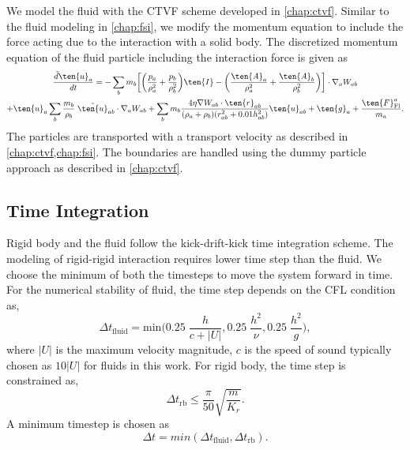 We model the fluid with the CTVF \parencite{adepu2021corrected} scheme
developed in \cref{chap:ctvf}. Similar to the fluid modeling in
\cref{chap:fsi}, we modify the momentum equation to include the force acting due
to the interaction with a solid body. The discretized momentum equation of the
fluid particle including the interaction force is given as
\begin{multline}
  \label{eq:rfc:sph-momentum-fluid}
  \frac{\tilde{d}\ten{u}_{a}}{dt} = - \sum_{b} m_b \bigg[
  \bigg(\frac{p_a}{\rho_a^2} + \frac{p_b}{\rho_b^2}\bigg) \ten{I} -
  \bigg(\frac{\ten{A}_a}{\rho_a^2} + \frac{\ten{A}_b}{\rho_b^2}
  \bigg) \bigg]
  \cdot \nabla_{a} W_{ab} \\
  + \ten{u}_{a} \sum_{b} \frac{m_b}{\rho_{b}} \; \tilde{\ten{u}}_{ab} \cdot
  \nabla_{a} W_{ab} + \sum_{b} m_b \frac{4 \eta \nabla W_{ab}\cdot
    \ten{r}_{ab}}{(\rho_a + \rho_b) (r_{ab}^2 + 0.01 h_{ab}^2)} \ten{u}_{ab} +
  \ten{g}_{a} + \frac{\ten{F}^a_{\text{Fl}}}{m_a}.
\end{multline}
The particles are transported with a transport velocity as described in
\cref{chap:ctvf,chap:fsi}. The boundaries are handled using the dummy particle
approach as described in \cref{chap:ctvf}.

\subsection{Time Integration}

Rigid body and the fluid follow the kick-drift-kick time integration scheme. The
modeling of rigid-rigid interaction requires lower time step than the fluid. We
choose the minimum of both the timesteps to move the system forward in time. For
the numerical stability of fluid, the time step depends on the CFL condition as,
\begin{equation}
  \label{eq:rfc:time-step-cfl}
  \Delta t_{\text{fluid}} = \mathrm{min} \bigg( 0.25 \; \frac{h}{c + |U|} ,  0.25 \; \frac{h^2}{\nu},  0.25 \; \frac{h^2}{g} \bigg),
\end{equation}
where $|U|$ is the maximum velocity magnitude, $c$ is the speed of sound
typically chosen as $10 |U|$ for fluids in this work. For rigid body, the time
step is constrained as,
\begin{equation}
  \label{eq:rfc:time-step-body-force}
  \Delta t_{\text{rb}} \leq \frac{\pi}{50} \sqrt{\frac{m}{K_r}}.
\end{equation}
A minimum timestep is chosen as
\begin{equation}
  \label{eq:rfc:time-step-body-force}
  \Delta t = min(\Delta t_{\text{fluid}}, \Delta t_{\text{rb}}).
\end{equation}



